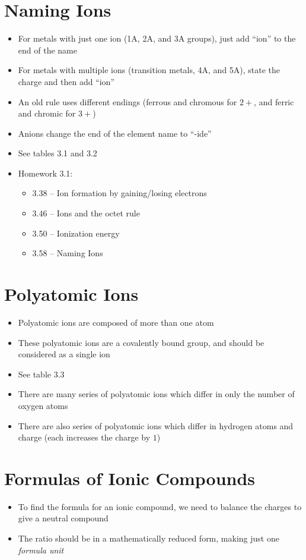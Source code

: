 \documentclass[12pt, openany, letterpaper]{memoir}
\begin{document}
\section{Naming Ions}
\begin{itemize}
	\item For metals with just one ion (1A, 2A, and 3A groups), just add ``ion'' to the end of the name
	\item For metals with multiple ions (transition metals, 4A, and 5A), state the charge and then add ``ion''
	\item An old rule uses different endings (ferrous and chromous for $2+$, and ferric and chromic for $3+$)
	\item Anions change the end of the element name to ``-ide''
	\item See tables 3.1 and 3.2
	\item Homework 3.1:
	\begin{itemize}
		\item 3.38 -- Ion formation by gaining/losing electrons
		\item 3.46 -- Ions and the octet rule
		\item 3.50 -- Ionization energy
		\item 3.58 -- Naming Ions
	\end{itemize}
	
\end{itemize}

\section{Polyatomic Ions}
\begin{itemize}
	\item Polyatomic ions are composed of more than one atom
	\item These polyatomic ions are a covalently bound group, and should be considered as a single ion
	\item See table 3.3
	\item There are many series of polyatomic ions which differ in only the number of oxygen atoms
	\item There are also series of polyatomic ions which differ in hydrogen atoms and charge (each  increases the charge by $1$)
\end{itemize}

\section{Formulas of Ionic Compounds}
\begin{itemize}
	\item To find the formula for an ionic compound, we need to balance the charges to give a neutral compound
	\item The ratio should be in a mathematically reduced form, making just one \emph{formula unit}
\end{itemize}
\end{document}
